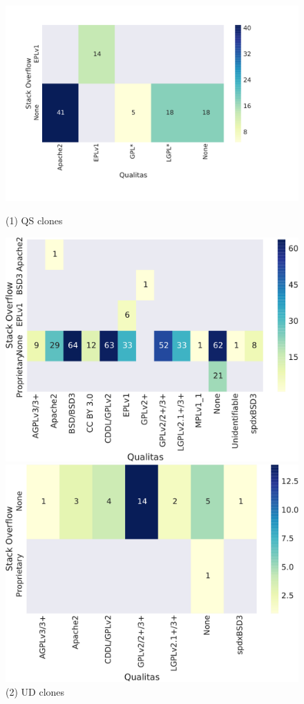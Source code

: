 \documentclass[sigconf,review, anonymous]{acmart}
\begin{document}
\begin{figure}
	\includegraphics[width=\linewidth]{heatmap_a}
	\caption*{(1) QS clones}\label{fig:heatmap_a}
	\endminipage\hspace{0.3cm}
	\includegraphics[width=\linewidth]{heatmap_b}
	\caption*{(2) UD clones}\label{fig:heatmap_b}
	\endminipage\hfill
	\includegraphics[width=\linewidth]{heatmap_c}

\end{figure}
\end{document}
